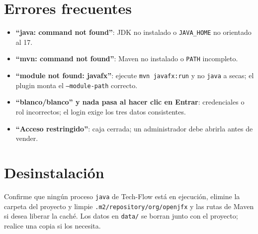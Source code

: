 \documentclass[12pt,a4paper]{report}
\begin{document}
\section{Errores frecuentes}
\begin{itemize}
\item \textbf{``java: command not found''}: JDK no instalado o \texttt{JAVA\_HOME} no orientado al 17.
\item \textbf{``mvn: command not found''}: Maven no instalado o \texttt{PATH} incompleto.
\item \textbf{``module not found: javafx''}: ejecute \texttt{mvn javafx:run} y no \texttt{java} a secas; el plugin monta el \texttt{--module-path} correcto.
\item \textbf{``blanco/blanco'' y nada pasa al hacer clic en Entrar}: credenciales o rol incorrectos; el login exige los tres datos consistentes.
\item \textbf{``Acceso restringido''}: caja cerrada; un administrador debe abrirla antes de vender.
\end{itemize}

\section{Desinstalación}
Confirme que ningún proceso \texttt{java} de Tech-Flow está en ejecución, elimine la carpeta del proyecto y limpie \texttt{.m2/repository/org/openjfx} y las rutas de Maven si desea liberar la caché. Los datos en \texttt{data/} se borran junto con el proyecto; realice una copia si los necesita.
\end{document}
